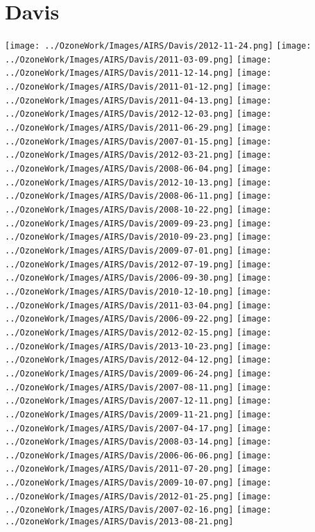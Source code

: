\section{Davis}
  \texttt{[image: ../OzoneWork/Images/AIRS/Davis/2012-11-24.png]}
  \texttt{[image: ../OzoneWork/Images/AIRS/Davis/2011-03-09.png]}
  \texttt{[image: ../OzoneWork/Images/AIRS/Davis/2011-12-14.png]}
  \texttt{[image: ../OzoneWork/Images/AIRS/Davis/2011-01-12.png]}
  \texttt{[image: ../OzoneWork/Images/AIRS/Davis/2011-04-13.png]}
  \texttt{[image: ../OzoneWork/Images/AIRS/Davis/2012-12-03.png]}
  \texttt{[image: ../OzoneWork/Images/AIRS/Davis/2011-06-29.png]}
  \texttt{[image: ../OzoneWork/Images/AIRS/Davis/2007-01-15.png]}
  \texttt{[image: ../OzoneWork/Images/AIRS/Davis/2012-03-21.png]}
  \texttt{[image: ../OzoneWork/Images/AIRS/Davis/2008-06-04.png]}
  \texttt{[image: ../OzoneWork/Images/AIRS/Davis/2012-10-13.png]}
  \texttt{[image: ../OzoneWork/Images/AIRS/Davis/2008-06-11.png]}
  \texttt{[image: ../OzoneWork/Images/AIRS/Davis/2008-10-22.png]}
  \texttt{[image: ../OzoneWork/Images/AIRS/Davis/2009-09-23.png]}
  \texttt{[image: ../OzoneWork/Images/AIRS/Davis/2010-09-23.png]}
  \texttt{[image: ../OzoneWork/Images/AIRS/Davis/2009-07-01.png]}
  \texttt{[image: ../OzoneWork/Images/AIRS/Davis/2012-07-19.png]}
  \texttt{[image: ../OzoneWork/Images/AIRS/Davis/2006-09-30.png]}
  \texttt{[image: ../OzoneWork/Images/AIRS/Davis/2010-12-10.png]}
  \texttt{[image: ../OzoneWork/Images/AIRS/Davis/2011-03-04.png]}
  \texttt{[image: ../OzoneWork/Images/AIRS/Davis/2006-09-22.png]}
  \texttt{[image: ../OzoneWork/Images/AIRS/Davis/2012-02-15.png]}
  \texttt{[image: ../OzoneWork/Images/AIRS/Davis/2013-10-23.png]}
  \texttt{[image: ../OzoneWork/Images/AIRS/Davis/2012-04-12.png]}
  \texttt{[image: ../OzoneWork/Images/AIRS/Davis/2009-06-24.png]}
  \texttt{[image: ../OzoneWork/Images/AIRS/Davis/2007-08-11.png]}
  \texttt{[image: ../OzoneWork/Images/AIRS/Davis/2007-12-11.png]}
  \texttt{[image: ../OzoneWork/Images/AIRS/Davis/2009-11-21.png]}
  \texttt{[image: ../OzoneWork/Images/AIRS/Davis/2007-04-17.png]}
  \texttt{[image: ../OzoneWork/Images/AIRS/Davis/2008-03-14.png]}
  \texttt{[image: ../OzoneWork/Images/AIRS/Davis/2006-06-06.png]}
  \texttt{[image: ../OzoneWork/Images/AIRS/Davis/2011-07-20.png]}
  \texttt{[image: ../OzoneWork/Images/AIRS/Davis/2009-10-07.png]}
  \texttt{[image: ../OzoneWork/Images/AIRS/Davis/2012-01-25.png]}
  \texttt{[image: ../OzoneWork/Images/AIRS/Davis/2007-02-16.png]}
  \texttt{[image: ../OzoneWork/Images/AIRS/Davis/2013-08-21.png]}
